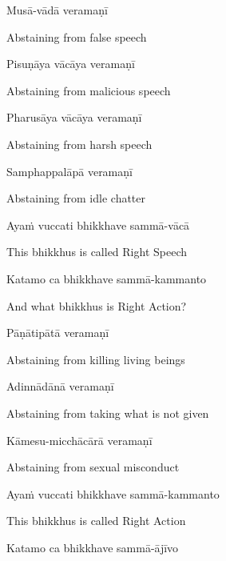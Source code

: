 Musā-vādā veramaṇī

\begin{english}
  Abstaining from false speech
\end{english}

Pisuṇāya vācāya veramaṇī

\begin{english}
  Abstaining from malicious speech
\end{english}

Pharusāya vācāya veramaṇī

\begin{english}
  Abstaining from harsh speech
\end{english}

Samphappalāpā veramaṇī

\begin{english}
  Abstaining from idle chatter
\end{english}

Ayaṁ vuccati bhikkhave sammā-vācā

\begin{english}
  This bhikkhus is called Right Speech
\end{english}

Katamo ca bhikkhave sammā-kammanto

\begin{english}
  And what bhikkhus is Right Action?
\end{english}

Pāṇātipātā veramaṇī

\begin{english}
  Abstaining from killing living beings
\end{english}

Adinnādānā veramaṇī

\begin{english}
  Abstaining from taking what is not given
\end{english}

Kāmesu-micchācārā veramaṇī

\begin{english}
  Abstaining from sexual misconduct
\end{english}

Ayaṁ vuccati bhikkhave sammā-kammanto

\begin{english}
  This bhikkhus is called Right Action
\end{english}

Katamo ca bhikkhave sammā-ājīvo

